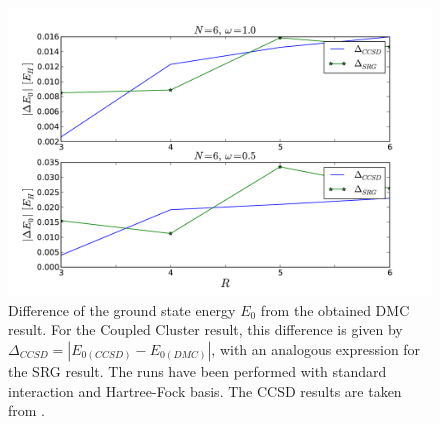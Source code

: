 \begin{figure}
\begin{center}
\includegraphics[scale=0.4]{../Plots/compCCSDSRG.pdf}
\caption{Difference of the ground state energy $E_0$ from the obtained DMC result. For the Coupled Cluster result, this difference is given by $\Delta_{CCSD} = |E_{0(CCSD)}-E_{0(DMC)}|$, with an analogous expression for the SRG result. The runs have been performed with standard interaction and Hartree-Fock basis. The CCSD results are taken from \cite{Christoffer}.}
\end{center}
\end{figure}


